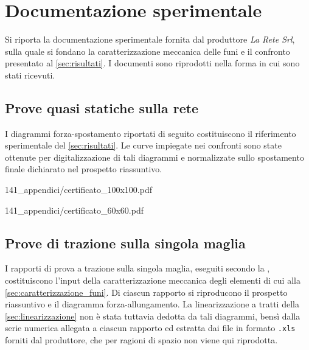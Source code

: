 \chapter{Documentazione sperimentale}
\label{app:documentazione}

Si riporta la documentazione sperimentale fornita dal produttore \textit{La Rete Srl}, sulla quale si fondano la caratterizzazione meccanica delle funi e il confronto presentato al \cref{sec:risultati}. I documenti sono riprodotti nella forma in cui sono stati ricevuti.

\section{Prove quasi statiche sulla rete}
\label{app:prove_quasi_statiche}

I diagrammi forza-spostamento riportati di seguito costituiscono il riferimento sperimentale del \cref{sec:risultati}. Le curve impiegate nei confronti sono state ottenute per digitalizzazione di tali diagrammi e normalizzate sullo spostamento finale dichiarato nel prospetto riassuntivo.


           {141_appendici/certificato_100x100.pdf}


           {141_appendici/certificato_60x60.pdf}

\section{Prove di trazione sulla singola maglia}
\label{app:prove_trazione}

I rapporti di prova a trazione sulla singola maglia, eseguiti secondo la \cite{ENISO1806-2002}, costituiscono l'input della caratterizzazione meccanica degli elementi di cui alla \cref{sec:caratterizzazione_funi}. Di ciascun rapporto si riproducono il prospetto riassuntivo e il diagramma forza-allungamento. La linearizzazione a tratti della \cref{sec:linearizzazione} non è stata tuttavia dedotta da tali diagrammi, bensì dalla serie numerica allegata a ciascun rapporto ed estratta dai file in formato \texttt{.xls} forniti dal produttore, che per ragioni di spazio non viene qui riprodotta.

